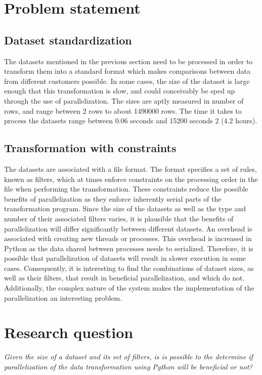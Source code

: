\section{Problem statement}
\subsection{Dataset standardization}
The datasets mentioned in the previous section need to be processed in order to transform them into a standard format
which makes comparisons between data from different customers possible. 
In some cases, the size of the dataset is large enough that this transformation is slow, and could conceivably be sped up through
the use of parallelization. The sizes are aptly measured in number of rows, and range between 2 rows to about 1490000 rows. The time
it takes to process the datasets range between 0.06 seconds and 15200 seconds 2 (4.2 hours).

\subsection{Transformation with constraints}
The datasets are associated with a file format. The format specifies a set of rules, known as filters, which at times enforce
constraints on the processing order in the file when performing the transformation. These constraints reduce the possible benefits of parallelization as they enforce
inherently serial parts of the transformation program.  Since the size of the datasets as well as the type and number of their
associated filters varies, it is plausible that the benefits of parallelization will differ significantly between different datasets.
An overhead is associated with creating new threads or processes.  This overhead is increased in Python as the data shared between processes needs to serialized.
Therefore, it is possible that parallelization of datasets will result in slower execution in some cases. Consequently, it is
interesting to find the combinations of dataset sizes, as well as their filters, that result in beneficial parallelization, and which do not.
Additionally, the complex nature of the system makes the implementation of the parallelization an interesting problem.

\section{Research question}
\emph{Given the size of a dataset and its set of filters, is is possible to the determine 
if parallelization of the data transformation using Python will be beneficial or not?}

